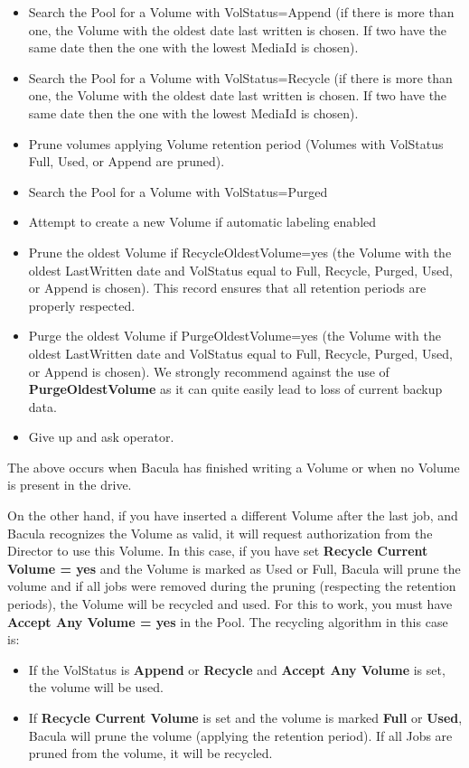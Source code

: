 \begin{itemize}
\item Search the Pool for a Volume with VolStatus=Append (if there is  more
   than one, the Volume with the oldest date last written is  chosen. If two have
   the same date then the one with  the lowest MediaId is chosen). 
\item Search the Pool for a Volume with VolStatus=Recycle (if there is  more
   than one, the Volume with the oldest date last written is  chosen. If two have
   the same date then the one with  the lowest MediaId is chosen). 
\item Prune volumes applying Volume retention period (Volumes with VolStatus 
   Full, Used, or Append are pruned). 
\item Search the Pool for a Volume with VolStatus=Purged 
\item Attempt to create a new Volume if automatic labeling enabled 
\item Prune the oldest Volume if RecycleOldestVolume=yes (the Volume  with the
   oldest LastWritten date and VolStatus equal to  Full, Recycle, Purged, Used,
   or Append is chosen). This  record ensures that all retention periods are
properly  respected. 
\item Purge the oldest Volume if PurgeOldestVolume=yes (the Volume  with the
   oldest LastWritten date and VolStatus equal to  Full, Recycle, Purged, Used,
   or Append is chosen). We strongly  recommend against the use of {\bf
PurgeOldestVolume} as it  can quite easily lead to loss of current backup
data. 
\item Give up and ask operator. 
   \end{itemize}

The above occurs when Bacula has finished writing a Volume or when no Volume
is present in the drive. 

On the other hand, if you have inserted a different Volume after the last job,
and Bacula recognizes the Volume as valid, it will request authorization from
the Director to use this Volume. In this case, if you have set {\bf Recycle
Current Volume = yes} and the Volume is marked as Used or Full, Bacula will
prune the volume and if all jobs were removed during the pruning (respecting
the retention periods), the Volume will be recycled and used. For this to
work, you must have {\bf Accept Any Volume = yes} in the Pool. The recycling
algorithm in this case is: 

\begin{itemize}
\item If the VolStatus is {\bf Append} or {\bf Recycle}  and {\bf Accept Any
   Volume} is set, the volume  will be used.  
\item If {\bf Recycle Current Volume} is set and the  volume is marked {\bf
   Full} or {\bf Used}, Bacula  will prune the volume (applying the retention
   period).  If all Jobs are pruned from the volume, it will be  recycled. 
\end{itemize}


